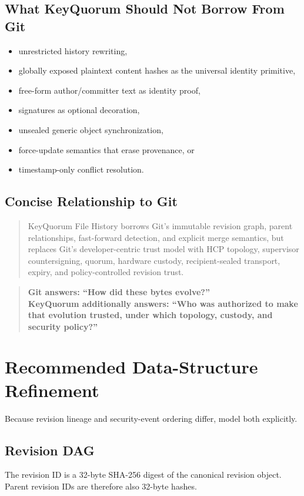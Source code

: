 \documentclass[11pt]{article}
\begin{document}
\subsection{What KeyQuorum Should Not Borrow From Git}
\begin{itemize}[leftmargin=1.5em]
  \item unrestricted history rewriting,
  \item globally exposed plaintext content hashes as the universal identity primitive,
  \item free-form author/committer text as identity proof,
  \item signatures as optional decoration,
  \item unsealed generic object synchronization,
  \item force-update semantics that erase provenance, or
  \item timestamp-only conflict resolution.
\end{itemize}

\subsection{Concise Relationship to Git}
\begin{quote}
KeyQuorum File History borrows Git's immutable revision graph, parent relationships, fast-forward detection, and explicit merge semantics, but replaces Git's developer-centric trust model with HCP topology, supervisor countersigning, quorum, hardware custody, recipient-sealed transport, expiry, and policy-controlled revision trust.
\end{quote}

\begin{quote}
\textbf{Git answers: ``How did these bytes evolve?''}\\[0.4em]
\textbf{KeyQuorum additionally answers: ``Who was authorized to make that evolution trusted, under which topology, custody, and security policy?''}
\end{quote}

\section{Recommended Data-Structure Refinement}
Because revision lineage and security-event ordering differ, model both explicitly.

\subsection{Revision DAG}
The revision ID is a 32-byte SHA-256 digest of the canonical revision object. Parent revision IDs are therefore also 32-byte hashes.
\end{document}
